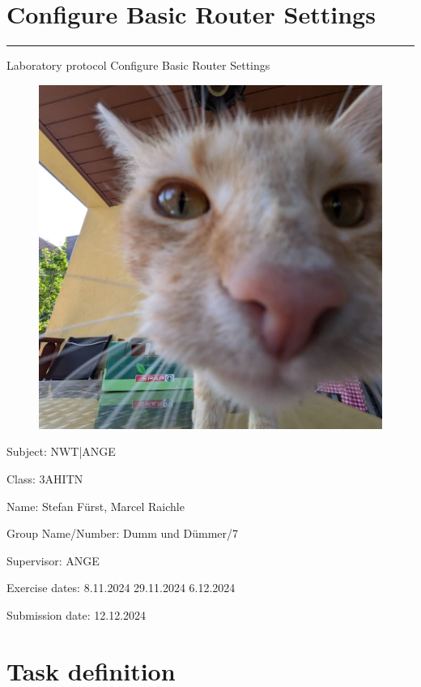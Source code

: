 \documentclass[a4paper]{article}
\begin{document}
\pagestyle{oida}
\section*{Configure Basic Router Settings}
\par\noindent\rule{\textwidth}{0.4pt}

Laboratory protocol
Configure Basic Router Settings

\begin{figure}[h]
	\includegraphics[scale=0.2]{images/mika.jpeg}
	\centering
\end{figure}

\vspace*{\fill}
Subject:	NWT|ANGE

Class:	3AHITN

Name:	Stefan Fürst, Marcel Raichle

Group Name/Number: Dumm und Dümmer/7

Supervisor: 	ANGE

Exercise dates:	8.11.2024 29.11.2024 6.12.2024

Submission date: 12.12.2024


\newpage
\tableofcontents

\newpage

\section{Task definition}
\end{document}
